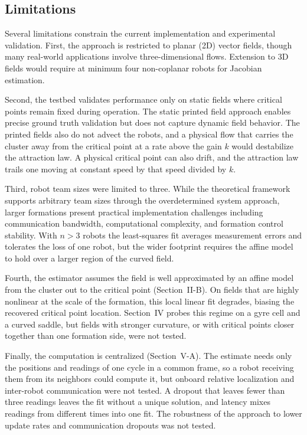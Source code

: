\documentclass[lettersize,journal]{IEEEtran}
\begin{document}
\subsection{Limitations}

Several limitations constrain the current implementation and experimental validation. First, the approach is restricted to planar (2D) vector fields, though many real-world applications involve three-dimensional flows. Extension to 3D fields would require at minimum four non-coplanar robots for Jacobian estimation.

Second, the testbed validates performance only on static fields where critical points remain fixed during operation. The static printed field approach enables precise ground truth validation but does not capture dynamic field behavior. The printed fields also do not advect the robots, and a physical flow that carries the cluster away from the critical point at a rate above the gain $k$ would destabilize the attraction law. A physical critical point can also drift, and the attraction law trails one moving at constant speed by that speed divided by $k$.

Third, robot team sizes were limited to three. While the theoretical framework supports arbitrary team sizes through the overdetermined system approach, larger formations present practical implementation challenges including communication bandwidth, computational complexity, and formation control stability. With $n > 3$ robots the least-squares fit averages measurement errors and tolerates the loss of one robot, but the wider footprint requires the affine model to hold over a larger region of the curved field.

Fourth, the estimator assumes the field is well approximated by an affine model from the cluster out to the critical point (Section~II-B). On fields that are highly nonlinear at the scale of the formation, this local linear fit degrades, biasing the recovered critical point location. Section~IV probes this regime on a gyre cell and a curved saddle, but fields with stronger curvature, or with critical points closer together than one formation side, were not tested.

Finally, the computation is centralized (Section~V-A). The estimate needs only the positions and readings of one cycle in a common frame, so a robot receiving them from its neighbors could compute it, but onboard relative localization and inter-robot communication were not tested. A dropout that leaves fewer than three readings leaves the fit without a unique solution, and latency mixes readings from different times into one fit. The robustness of the approach to lower update rates and communication dropouts was not tested.
\end{document}
